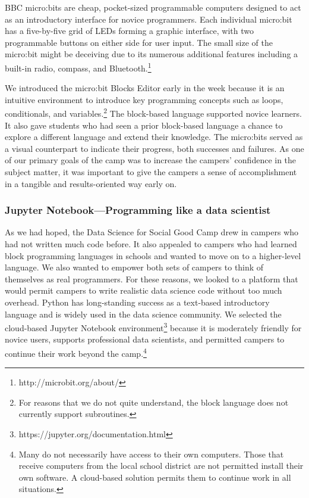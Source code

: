 BBC micro:bits are cheap, pocket-sized programmable computers
designed to act as an introductory interface for novice programmers.
Each individual micro:bit has a five-by-five grid of LEDs forming
a graphic interface, with two programmable buttons on either side
for user input.  The small size of the micro:bit might be deceiving
due to its numerous additional features including a built-in radio,
compass, and Bluetooth.\footnote{http://microbit.org/about/}

We introduced the micro:bit Blocks Editor early in the week because
it is an intuitive environment to introduce key programming
concepts such as loops, conditionals, and variables.\footnote{For
reasons that we do not quite understand, the block language does
not currently support subroutines.}  The block-based language 
supported novice learners.  It also gave students who had seen
a prior block-based language a chance to explore a different language
and extend their knowledge.  The micro:bits served as a visual counterpart
to indicate their progress, both successes and failures.  As one
of our primary goals of the camp was to increase the campers'
confidence in the subject matter, it was important to give the
campers a sense of accomplishment in a tangible and results-oriented
way early on.

\subsubsection{Jupyter Notebook---Programming like a data scientist}

As we had hoped, the Data Science for Social Good Camp drew in
campers who had not written much code before.  It also
appealed to campers who had learned block programming languages
in schools and wanted to move on to a higher-level language.  
We also wanted to empower both sets of campers to think
of themselves as real programmers.  For these reasons, we looked
to a platform that would permit campers to write realistic data
science code without too much overhead.  Python has long-standing
success as a text-based introductory language \cite{Guo2014} and
is widely used in the data science community.  We selected the
cloud-based Jupyter
Notebook environment\footnote{https://jupyter.org/documentation.html} 
because it is moderately friendly for novice users, supports
professional data scientists, and permitted campers 
to continue their work beyond the camp.\footnote{Many do not
necessarily have access to their own computers.  Those that receive
computers from the local school district are not permitted install
their own software.  A cloud-based solution permits them to continue
work in all situations.}

